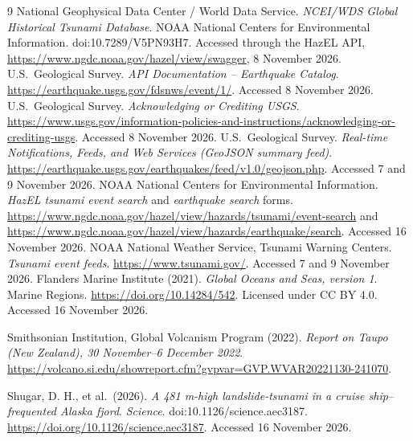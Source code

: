 \documentclass[a4paper,11pt,oneside]{book}
\begin{document}
\begin{thebibliography}{9}
 National Geophysical Data Center / World Data Service. \emph{NCEI/WDS Global Historical Tsunami Database}. NOAA National Centers for Environmental Information. doi:10.7289/V5PN93H7. Accessed through the HazEL API, \url{https://www.ngdc.noaa.gov/hazel/view/swagger}, 8 November 2026.
 U.S.\ Geological Survey. \emph{API Documentation -- Earthquake Catalog}. \url{https://earthquake.usgs.gov/fdsnws/event/1/}. Accessed 8 November 2026.
 U.S.\ Geological Survey. \emph{Acknowledging or Crediting USGS}. \url{https://www.usgs.gov/information-policies-and-instructions/acknowledging-or-crediting-usgs}. Accessed 8 November 2026.
 U.S.\ Geological Survey. \emph{Real-time Notifications, Feeds, and Web Services (GeoJSON summary feed)}. \url{https://earthquake.usgs.gov/earthquakes/feed/v1.0/geojson.php}. Accessed 7 and 9 November 2026.
 NOAA National Centers for Environmental Information. \emph{HazEL tsunami event search} and \emph{earthquake search} forms. \url{https://www.ngdc.noaa.gov/hazel/view/hazards/tsunami/event-search} and \url{https://www.ngdc.noaa.gov/hazel/view/hazards/earthquake/search}. Accessed 16 November 2026.
 NOAA National Weather Service, Tsunami Warning Centers. \emph{Tsunami event feeds}. \url{https://www.tsunami.gov/}. Accessed 7 and 9 November 2026.
Flanders Marine Institute (2021).
\emph{Global Oceans and Seas, version 1}.
Marine Regions.
\url{https://doi.org/10.14284/542}.
Licensed under CC BY 4.0.
Accessed 16 November 2026.

Smithsonian Institution, Global Volcanism Program (2022).
\emph{Report on Taupo (New Zealand),
30 November--6 December 2022}.
\url{https://volcano.si.edu/showreport.cfm?gvpvar=GVP.WVAR20221130-241070}.

Shugar, D. H., et al.\ (2026).
\emph{A 481 m-high landslide-tsunami in a
cruise ship--frequented Alaska fjord}.
\textit{Science}. doi:10.1126/science.aec3187.
\url{https://doi.org/10.1126/science.aec3187}.
Accessed 16 November 2026.
\end{thebibliography}
\end{document}
